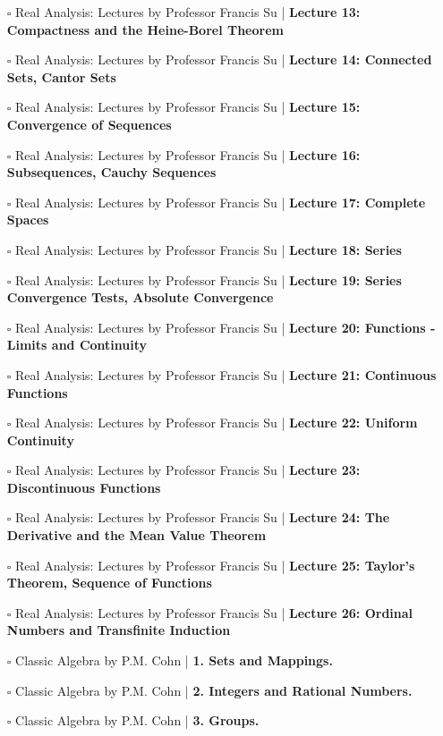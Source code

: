 \documentclass[a4, landscape, 12pt]{article}
\newcommand{\checkbox}{$\square$}%
\begin{document}
\begin{itemize}
{}
\item [\checkbox] Real Analysis: Lectures by Professor Francis Su  | \textbf{Lecture 13: Compactness and the Heine-Borel Theorem
}
\item [\checkbox] Real Analysis: Lectures by Professor Francis Su  | \textbf{Lecture 14: Connected Sets, Cantor Sets
}
\item [\checkbox] Real Analysis: Lectures by Professor Francis Su  | \textbf{Lecture 15: Convergence of Sequences
}
\item [\checkbox] Real Analysis: Lectures by Professor Francis Su  | \textbf{Lecture 16: Subsequences, Cauchy Sequences
}
\item [\checkbox] Real Analysis: Lectures by Professor Francis Su  | \textbf{Lecture 17: Complete Spaces
}
\item [\checkbox] Real Analysis: Lectures by Professor Francis Su  | \textbf{Lecture 18: Series
}
\item [\checkbox] Real Analysis: Lectures by Professor Francis Su  | \textbf{Lecture 19: Series Convergence Tests, Absolute Convergence
}
\item [\checkbox] Real Analysis: Lectures by Professor Francis Su  | \textbf{Lecture 20: Functions - Limits and Continuity
}
\item [\checkbox] Real Analysis: Lectures by Professor Francis Su  | \textbf{Lecture 21: Continuous Functions
}
\item [\checkbox] Real Analysis: Lectures by Professor Francis Su  | \textbf{Lecture 22: Uniform Continuity
}
\item [\checkbox] Real Analysis: Lectures by Professor Francis Su  | \textbf{Lecture 23: Discontinuous Functions
}
\item [\checkbox] Real Analysis: Lectures by Professor Francis Su  | \textbf{Lecture 24: The Derivative and the Mean Value Theorem
}
\item [\checkbox] Real Analysis: Lectures by Professor Francis Su  | \textbf{Lecture 25: Taylor's Theorem, Sequence of Functions
}
\item [\checkbox] Real Analysis: Lectures by Professor Francis Su  | \textbf{Lecture 26: Ordinal Numbers and Transfinite Induction
}
\item [\checkbox] Classic Algebra by P.M. Cohn  | \textbf{1. Sets and Mappings.
}
\item [\checkbox] Classic Algebra by P.M. Cohn  | \textbf{2. Integers and Rational Numbers.
}
\item [\checkbox] Classic Algebra by P.M. Cohn  | \textbf{3. Groups.
}
\end{itemize}
\end{document}
